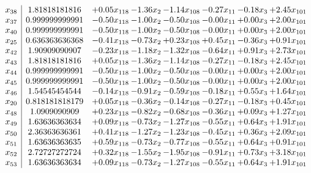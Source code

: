 \documentclass[8pt]{article}
\begin{document}
\[\begin{array}{c| c c@{\hskip 2pt} c@{\hskip 2pt} c@{\hskip 2pt} c@{\hskip 2pt} c@{\hskip 2pt} c@{\hskip 2pt} }
 x_{38}   &  1.81818181816 & +  0.05 x_{118} & -1.36 x_{2} & -1.14 x_{108} & -0.27 x_{11} & -0.18 x_{3} & +  2.45 x_{101}\\
 x_{37}   &  0.999999999991 & -0.50 x_{118} & -1.00 x_{2} & -0.50 x_{108} & -0.00 x_{11} & +  0.00 x_{3} & +  2.00 x_{101}\\
 x_{40}   &  0.999999999991 & -0.50 x_{118} & -1.00 x_{2} & -0.50 x_{108} & -0.00 x_{11} & +  0.00 x_{3} & +  2.00 x_{101}\\
 x_{25}   &  0.636363636368 & -0.41 x_{118} & -0.73 x_{2} & +  0.23 x_{108} & +  0.45 x_{11} & -0.36 x_{3} & +  0.91 x_{101}\\
 x_{42}   &  1.90909090907 & -0.23 x_{118} & -1.18 x_{2} & -1.32 x_{108} & -0.64 x_{11} & +  0.91 x_{3} & +  2.73 x_{101}\\
 x_{43}   &  1.81818181816 & +  0.05 x_{118} & -1.36 x_{2} & -1.14 x_{108} & -0.27 x_{11} & -0.18 x_{3} & +  2.45 x_{101}\\
 x_{44}   &  0.999999999991 & -0.50 x_{118} & -1.00 x_{2} & -0.50 x_{108} & -0.00 x_{11} & +  0.00 x_{3} & +  2.00 x_{101}\\
 x_{45}   &  0.999999999991 & -0.50 x_{118} & -1.00 x_{2} & -0.50 x_{108} & -0.00 x_{11} & +  0.00 x_{3} & +  2.00 x_{101}\\
 x_{46}   &  1.54545454544 & -0.14 x_{118} & -0.91 x_{2} & -0.59 x_{108} & -0.18 x_{11} & +  0.55 x_{3} & +  1.64 x_{101}\\
 x_{20}   &  0.818181818179 & +  0.05 x_{118} & -0.36 x_{2} & -0.14 x_{108} & -0.27 x_{11} & -0.18 x_{3} & +  0.45 x_{101}\\
 x_{48}   &  1.0909090909 & +  0.23 x_{118} & -0.82 x_{2} & -0.68 x_{108} & -0.36 x_{11} & +  0.09 x_{3} & +  1.27 x_{101}\\
 x_{49}   &  1.63636363634 & +  0.09 x_{118} & -0.73 x_{2} & -1.27 x_{108} & -0.55 x_{11} & +  0.64 x_{3} & +  1.91 x_{101}\\
 x_{50}   &  2.36363636361 & +  0.41 x_{118} & -1.27 x_{2} & -1.23 x_{108} & -0.45 x_{11} & +  0.36 x_{3} & +  2.09 x_{101}\\
 x_{51}   &  1.63636363635 & +  0.59 x_{118} & -0.73 x_{2} & -0.77 x_{108} & -0.55 x_{11} & +  0.64 x_{3} & +  0.91 x_{101}\\
 x_{52}   &  2.72727272724 & +  0.32 x_{118} & -1.55 x_{2} & -1.95 x_{108} & -0.91 x_{11} & +  0.73 x_{3} & +  3.18 x_{101}\\
 x_{53}   &  1.63636363634 & +  0.09 x_{118} & -0.73 x_{2} & -1.27 x_{108} & -0.55 x_{11} & +  0.64 x_{3} & +  1.91 x_{101}\\

\end{array}\]
\end{document}

